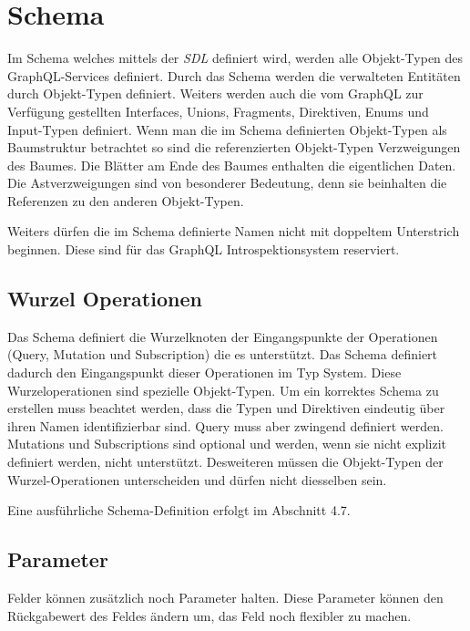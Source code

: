 \section{Schema}\label{test}
Im Schema welches mittels der \textit{SDL} definiert wird, werden alle Objekt-Typen des GraphQL-Services definiert.
Durch das Schema werden die verwalteten Entitäten durch Objekt-Typen definiert.
Weiters werden auch die vom GraphQL zur Verfügung gestellten Interfaces, Unions, Fragments, Direktiven, Enums und Input-Typen definiert.
Wenn man die im Schema definierten Objekt-Typen als Baumstruktur betrachtet so sind die referenzierten Objekt-Typen Verzweigungen des Baumes.
Die Blätter am Ende des Baumes enthalten die eigentlichen Daten.
Die Astverzweigungen sind von besonderer Bedeutung, denn sie beinhalten die Referenzen zu den anderen Objekt-Typen.
\parencite[S.60]{kress2020graphql}

Weiters dürfen die im Schema definierte Namen nicht mit doppeltem Unterstrich beginnen.
Diese sind für das GraphQL Introspektionsystem reserviert.
\parencite[Abs. 3.3]{graphqlOnline}

\subsection{Wurzel Operationen}
Das Schema definiert die Wurzelknoten der Eingangspunkte der Operationen (Query, Mutation und Subscription) die es unterstützt.
Das Schema definiert dadurch den Eingangspunkt dieser Operationen im Typ System.
Diese Wurzeloperationen sind spezielle Objekt-Typen.
Um ein korrektes Schema zu erstellen muss beachtet werden, dass die Typen und Direktiven eindeutig über ihren Namen identifizierbar sind.
Query muss aber zwingend definiert werden. Mutations und Subscriptions sind optional und werden, wenn sie nicht explizit definiert werden, nicht unterstützt.
Desweiteren müssen die Objekt-Typen der Wurzel-Operationen unterscheiden und dürfen nicht diesselben sein. 
\newline

Eine ausführliche Schema-Definition erfolgt im Abschnitt 4.7.

\subsection{Parameter}
Felder können zusätzlich noch Parameter halten.
Diese Parameter können den Rückgabewert des Feldes ändern um, das Feld noch flexibler zu machen.
\newline

